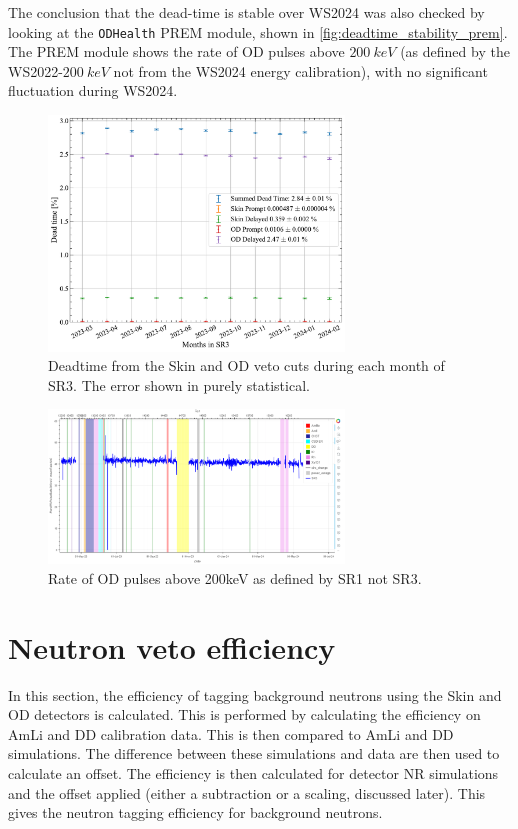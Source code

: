 The conclusion that the dead-time is stable over WS2024 was also checked by looking at the \lstinline{ODHealth} PREM module, shown in \autoref{fig:deadtime_stability_prem}.
The PREM module shows the rate of OD pulses above $200~keV$ (as defined by the WS2022-$200~keV$ not from the WS2024 energy calibration), with no significant fluctuation during WS2024.
\begin{figure}
	\centering
	\includegraphics[width=0.7\textwidth]{figures/VetoEfficiency/SR3DeadTimeAll_expoFunc.pdf}
	\caption{Deadtime from the Skin and OD veto cuts during each month of SR3. The error shown in purely statistical.}
	\label{fig:deadtime_stability}
\end{figure}
\begin{figure}
	\centering
	\includegraphics[width=0.7\textwidth]{figures/VetoEfficiency/prem_od_stability.png}
	\caption{Rate of OD pulses above 200keV as defined by SR1 not SR3.}
	\label{fig:deadtime_stability_prem}
\end{figure}

\section{Neutron veto efficiency}\label{sec:Veto/efficiency}
In this section, the efficiency of tagging background neutrons using the Skin and OD detectors is calculated.
This is performed by calculating the efficiency on AmLi and DD calibration data.
This is then compared to AmLi and DD simulations.
The difference between these simulations and data are then used to calculate an offset.
The efficiency is then calculated for detector NR simulations and the offset applied (either a subtraction or a scaling, discussed later).
This gives the neutron tagging efficiency for background neutrons.
